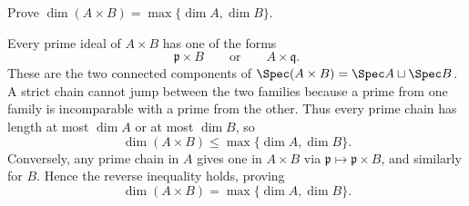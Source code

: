 \begin{problem}\label{prob:vi29-11}
Prove \(\dim(A\times B)=\max\{\dim A,\dim B\}\).

\end{problem}

\ifdefined\FullProblemDossiers
\begin{solution}
Every prime ideal of \(A\times B\) has one of the forms
\[
\mathfrak p\times B
\qquad\text{or}\qquad
A\times\mathfrak q.
\]
These are the two connected components of \(\Spec(A\times B)=\Spec A\sqcup\Spec B\).  A strict chain cannot jump
between the two families because a prime from one family is incomparable with a prime from the other.  Thus every
prime chain has length at most \(\dim A\) or at most \(\dim B\), so
\[
\dim(A\times B)\le\max\{\dim A,\dim B\}.
\]
Conversely, any prime chain in \(A\) gives one in \(A\times B\) via \(\mathfrak p\mapsto\mathfrak p\times B\),
and similarly for \(B\).  Hence the reverse inequality holds, proving
\[
\boxed{\dim(A\times B)=\max\{\dim A,\dim B\}}.
\]
\end{solution}
\fi
